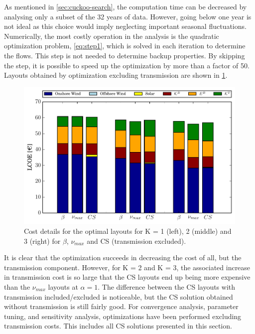 \documentclass[a4paper, 12pt, sort&compress]{elsarticle}%
\begin{document}
As mentioned in \cref{sec:cuckoo-search}, the computation time can be
decreased by analysing only a subset of the 32 years of data. However,
going below one year is not ideal as this choice would imply
neglecting important seasonal fluctuations. Numerically, the most
costly operation in the analysis is the quadratic optimization problem,
\cref{eq:step1}, which is solved in each iteration to determine the
flows. This step is not needed to determine backup properties. By
skipping the step, it is possible to speed up the optimization by more
than a factor of 50. Layouts obtained by optimization excluding
transmission are shown in \cref{fig:cost-no-transmission}.

\begin{figure}[h!]
  \centering
  \includegraphics[width = \columnwidth]{costTransVE50}
  \caption{Cost details for the optimal layouts for K = 1 (left), 2
    (middle) and 3 (right) for $\beta$, $\nu_{max}$ and CS (transmission excluded).}
  \label{fig:cost-no-transmission}
\end{figure}

It is clear that the optimization succeeds in decreasing the cost of
all, but the transmission component. However, for K = 2 and K = 3, the
associated increase in transmission cost is so large that the CS
layouts end up being more expensive than the $\nu_{max}$ layouts at
$\alpha = 1$. The difference between the CS layouts with transmission
included/excluded is noticeable, but the CS solution obtained without
transmission is still fairly good. For convergence analysis, parameter
tuning, and sensitivity analysis, optimizations have been performed
excluding transmission costs. This includes all CS solutions presented
in this section.
\end{document}
